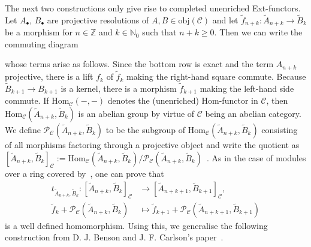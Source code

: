 \documentclass[12pt, a4paper]{article}
\numberwithin{equation}{section}
\theoremstyle{empty}
\theoremstyle{nonumberplain}
\begin{document}
The next two constructions only give rise to completed unenriched Ext-functors. Let $A_{\bullet}$, $B_{\bullet}$ are projective resolutions of $A, B \in \mathrm{obj}(\mathcal{C})$ and let $\widetilde{f}_{n+k}: \widetilde{A}_{n+k} \rightarrow \widetilde{B}_k$ be a morphism for $n \in \mathbb{Z}$ and $k \in \mathbb{N}_0$ such that $n+k \geq 0$. Then we can write the commuting diagram
\begin{center}
\end{center}
whose terms arise as follows. Since the bottom row is exact and the term $A_{n+k}$ projective, there is a lift $f_k$ of $\widetilde{f}_k$ making the right-hand square commute. Because $\widetilde{B}_{k+1} \rightarrow B_{k+1}$ is a kernel, there is a morphism $\widetilde{f}_{k+1}$ making the left-hand side commute. If $\mathrm{Hom}_{\mathcal{C}}(-, -)$ denotes the (unenriched) Hom-functor in $\mathcal{C}$, then $\mathrm{Hom}_{\mathcal{C}}(\widetilde{A}_{n+k}, \widetilde{B}_k)$ is an abelian group by virtue of $\mathcal{C}$ being an abelian category. We define $\mathcal{P}_{\mathcal{C}}(\widetilde{A}_{n+k}, \widetilde{B}_k)$ to be the subgroup of $\mathrm{Hom}_{\mathcal{C}}(\widetilde{A}_{n+k}, \widetilde{B}_k)$ consisting of all morphisms factoring through a projective object and write the quotient as $[\widetilde{A}_{n+k}, \widetilde{B}_k]_{\mathcal{C}} := \mathrm{Hom}_{\mathcal{C}}(\widetilde{A}_{n+k}, \widetilde{B}_k)/ \mathcal{P}_{\mathcal{C}}(\widetilde{A}_{n+k}, \widetilde{B}_k)$~\cite[p.~203]{kro95}. As in the case of modules over a ring covered by~\cite[p.~204]{kro95}, one can prove that
\begin{align*}
t_{\widetilde{A}_{n+k}, \widetilde{B}_k}: [\widetilde{A}_{n+k}, \widetilde{B}_k]_{\mathcal{C}} &\rightarrow [\widetilde{A}_{n+k+1}, \widetilde{B}_{k+1}]_{\mathcal{C}}, \\
\widetilde{f}_k + \mathcal{P}_{\mathcal{C}}(\widetilde{A}_{n+k}, \widetilde{B}_k) &\mapsto \widetilde{f}_{k+1} + \mathcal{P}_{\mathcal{C}}(\widetilde{A}_{n+k+1}, \widetilde{B}_{k+1})
\end{align*}
is a well defined homomorphism. Using this, we generalise the following construction from D.\! J.\! Benson and J.\! F.\! Carlson's paper~\cite[p.~109]{ben92}.
\end{document}
